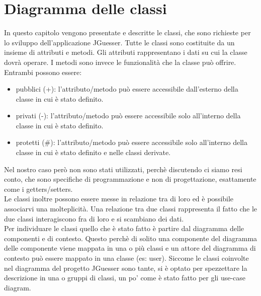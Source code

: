 \section{Diagramma delle classi}
In questo capitolo vengono presentate e descritte le classi, che sono richieste per lo sviluppo dell'applicazione JGuesser. Tutte le classi sono costituite da un insieme di attributi e metodi. Gli attributi rappresentano i dati su cui la classe dovrà operare. I metodi sono invece le funzionalità che la classe può offrire. Entrambi possono essere:
\begin{itemize}
    \item pubblici (+): l'attributo/metodo può essere accessibile dall'esterno della classe in cui è stato definito.
    \item privati (-): l'attributo/metodo può essere accessibile solo all'interno della classe in cui è stato definito.
    \item protetti (\#): l'attributo/metodo può essere accessibile solo all'interno della classe in cui è stato definito e nelle classi derivate.
\end{itemize}
\noindent
Nel nostro caso però non sono stati utilizzati, perchè discutendo ci siamo resi conto, che sono specifiche di programmazione e non di progettazione, esattamente come i getters/setters. \\
Le classi inoltre possono essere messe in relazione tra di loro ed è possibile associarvi una molteplicità. Una relazione tra due classi rappresenta il fatto che le due classi interagiscono fra di loro e si scambiano dei dati. \\
Per individuare le classi quello che è stato fatto è partire dal diagramma delle componenti e di contesto. Questo perchè di solito una componente del diagramma delle componente viene mappata in una o più classi e un attore del diagramma di contesto può essere mappato in una classe (es: user). Siccome le classi coinvolte nel diagramma del progetto JGuesser sono tante, si è optato per spezzettare la descrizione in una o gruppi di classi, un po' come è stato fatto per gli use-case diagram.

\newpage
